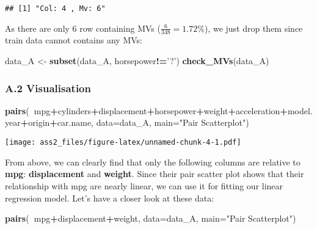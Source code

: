 \documentclass[]{article}
\newenvironment{Shaded}{\begin{snugshade}}{\end{snugshade}}
\newcommand{\KeywordTok}[1]{\textcolor[rgb]{0.13,0.29,0.53}{\textbf{#1}}}
\newcommand{\DataTypeTok}[1]{\textcolor[rgb]{0.13,0.29,0.53}{#1}}
\newcommand{\StringTok}[1]{\textcolor[rgb]{0.31,0.60,0.02}{#1}}
\newcommand{\OperatorTok}[1]{\textcolor[rgb]{0.81,0.36,0.00}{\textbf{#1}}}
\newcommand{\NormalTok}[1]{#1}
\begin{document}
\begin{verbatim}
## [1] "Col: 4 , Mv: 6"
\end{verbatim}

As there are only 6 row containing MVs (\(\frac{6}{348}=1.72\%\)), we
just drop them since train data cannot contains any MVs:

\begin{Shaded}
\begin{Highlighting}[]
\NormalTok{data_A <-}\StringTok{ }\KeywordTok{subset}\NormalTok{(data_A, horsepower}\OperatorTok{!=}\StringTok{'?'}\NormalTok{)}
\KeywordTok{check_MVs}\NormalTok{(data_A)}
\end{Highlighting}
\end{Shaded}

\subsubsection{A.2 Visualisation}\label{a.2-visualisation}

\begin{Shaded}
\begin{Highlighting}[]
\KeywordTok{pairs}\NormalTok{(}\OperatorTok{~}\NormalTok{mpg}\OperatorTok{+}\NormalTok{cylinders}\OperatorTok{+}\NormalTok{displacement}\OperatorTok{+}\NormalTok{horsepower}\OperatorTok{+}\NormalTok{weight}\OperatorTok{+}\NormalTok{acceleration}\OperatorTok{+}\NormalTok{model.year}\OperatorTok{+}\NormalTok{origin}\OperatorTok{+}\NormalTok{car.name,}
      \DataTypeTok{data=}\NormalTok{data_A, }
   \DataTypeTok{main=}\StringTok{"Pair Scatterplot"}\NormalTok{)}
\end{Highlighting}
\end{Shaded}

\texttt{[image: ass2\_files/figure-latex/unnamed-chunk-4-1.pdf]}

From above, we can clearly find that only the following columns are
relative to \textbf{mpg}: \textbf{displacement} and \textbf{weight}.
Since their pair scatter plot shows that their relationship with mpg are
nearly linear, we can use it for fitting our linear regression model.
Let's have a closer look at these data:

\begin{Shaded}
\begin{Highlighting}[]
\KeywordTok{pairs}\NormalTok{(}\OperatorTok{~}\NormalTok{mpg}\OperatorTok{+}\NormalTok{displacement}\OperatorTok{+}\NormalTok{weight,}
      \DataTypeTok{data=}\NormalTok{data_A, }
   \DataTypeTok{main=}\StringTok{"Pair Scatterplot"}\NormalTok{)}
\end{Highlighting}
\end{Shaded}
\end{document}
